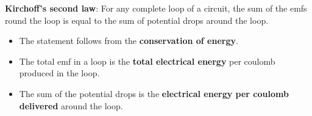 \textbf{Kirchoff's second law}: For any complete loop of a circuit, the sum of the emfs round the loop is equal to the sum of potential drops around the loop.
\begin{itemize}
    \item The statement follows from the \textbf{conservation of energy}.
    \item The total emf in a loop is the \textbf{total electrical energy} per coulomb produced in the loop.
    \item The sum of the potential drops is the \textbf{electrical energy per coulomb delivered} around the loop.
\end{itemize}
